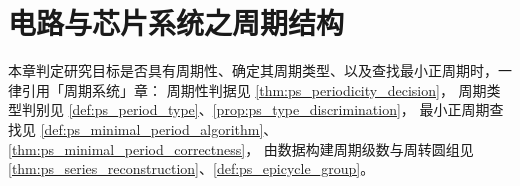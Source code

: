 \chapter{电路与芯片系统之周期结构}

\begin{remark}[本章目标的周期性判定（引用）]\label{rem:circuit_ps_hook}
本章判定研究目标是否具有周期性、确定其周期类型、以及查找最小正周期时，一律引用「周期系统」章：
周期性判据见 \cref{thm:ps_periodicity_decision}，
周期类型判别见 \cref{def:ps_period_type}、\cref{prop:ps_type_discrimination}，
最小正周期查找见 \cref{def:ps_minimal_period_algorithm}、\cref{thm:ps_minimal_period_correctness}，
由数据构建周期级数与周转圆组见 \cref{thm:ps_series_reconstruction}、\cref{def:ps_epicycle_group}。
\end{remark}

